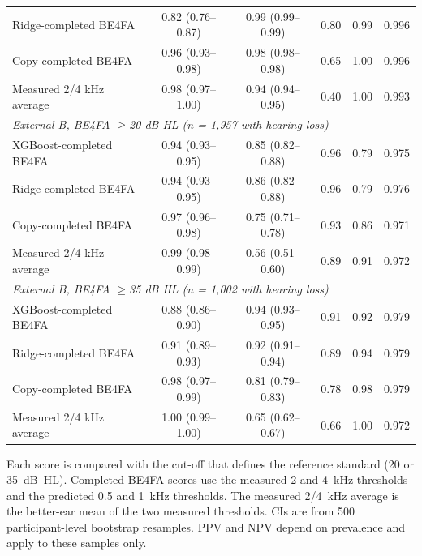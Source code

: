 \begin{table}[p]
\begin{tabular}{l ccccc}
\quad Ridge-completed BE4FA & 0.82 (0.76--0.87) & 0.99 (0.99--0.99) & 0.80 & 0.99 & 0.996 \\
\quad Copy-completed BE4FA & 0.96 (0.93--0.98) & 0.98 (0.98--0.98) & 0.65 & 1.00 & 0.996 \\
\quad Measured 2/4 kHz average & 0.98 (0.97--1.00) & 0.94 (0.94--0.95) & 0.40 & 1.00 & 0.993 \\
\multicolumn{6}{l}{\textit{External B, BE4FA $\geq$20 dB HL (n = 1,957 with hearing loss)}} \\
\quad XGBoost-completed BE4FA & 0.94 (0.93--0.95) & 0.85 (0.82--0.88) & 0.96 & 0.79 & 0.975 \\
\quad Ridge-completed BE4FA & 0.94 (0.93--0.95) & 0.86 (0.82--0.88) & 0.96 & 0.79 & 0.976 \\
\quad Copy-completed BE4FA & 0.97 (0.96--0.98) & 0.75 (0.71--0.78) & 0.93 & 0.86 & 0.971 \\
\quad Measured 2/4 kHz average & 0.99 (0.98--0.99) & 0.56 (0.51--0.60) & 0.89 & 0.91 & 0.972 \\
\multicolumn{6}{l}{\textit{External B, BE4FA $\geq$35 dB HL (n = 1,002 with hearing loss)}} \\
\quad XGBoost-completed BE4FA & 0.88 (0.86--0.90) & 0.94 (0.93--0.95) & 0.91 & 0.92 & 0.979 \\
\quad Ridge-completed BE4FA & 0.91 (0.89--0.93) & 0.92 (0.91--0.94) & 0.89 & 0.94 & 0.979 \\
\quad Copy-completed BE4FA & 0.98 (0.97--0.99) & 0.81 (0.79--0.83) & 0.78 & 0.98 & 0.979 \\
\quad Measured 2/4 kHz average & 1.00 (0.99--1.00) & 0.65 (0.62--0.67) & 0.66 & 1.00 & 0.972 \\
\bottomrule
\end{tabular}
\par\smallskip\raggedright
Each score is compared with the cut-off that defines the reference standard (20 or 35~dB~HL). Completed BE4FA scores use the measured 2 and 4~kHz thresholds and the predicted 0.5 and 1~kHz thresholds. The measured 2/4~kHz average is the better-ear mean of the two measured thresholds. CIs are from 500 participant-level bootstrap resamples. PPV and NPV depend on prevalence and apply to these samples only.
\end{table}
